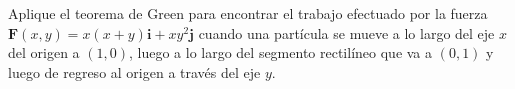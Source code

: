 \item Aplique el teorema de Green para encontrar el trabajo efectuado por la fuerza $\mathbf{F}(x, y) = x(x + y)\mathbf{i} + xy^2\mathbf{j}$ cuando una partícula se mueve a lo largo del eje $x$ del origen a $(1, 0)$, luego a lo largo del segmento rectilíneo que va a $(0, 1)$ y luego de regreso al origen a través del eje $y$.
